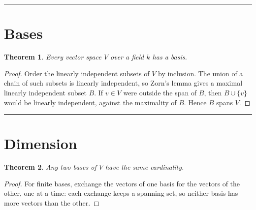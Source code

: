 \documentclass[12pt]{article}
\newtheorem{theorem}{Theorem}
\begin{document}
\noindent\rule{0.5\paperwidth}{1cm}

\section*{Bases}

\begin{theorem}
Every vector space $V$ over a field $k$ has a basis.
\end{theorem}

\begin{proof}
Order the linearly independent subsets of $V$ by inclusion. The union of a
chain of such subsets is linearly independent, so Zorn's lemma gives a
maximal linearly independent subset $B$. If $v \in V$ were outside the span
of $B$, then $B \cup \{v\}$ would be linearly independent, against the
maximality of $B$. Hence $B$ spans $V$.
\end{proof}

\newpage
\noindent\rule{0.25\paperwidth}{1cm}

\section*{Dimension}

\begin{theorem}
Any two bases of $V$ have the same cardinality.
\end{theorem}

\begin{proof}
For finite bases, exchange the vectors of one basis for the vectors of the
other, one at a time: each exchange keeps a spanning set, so neither basis
has more vectors than the other.
\end{proof}
\end{document}

